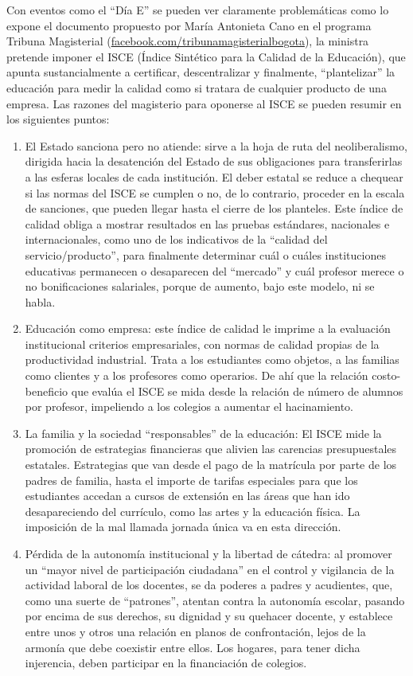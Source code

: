 \documentclass[10pt,twoside]{article}
\begin{document}
Con eventos como el “Día E” se pueden ver claramente problemáticas como lo expone el documento propuesto por María Antonieta Cano en el programa Tribuna Magisterial (\url{facebook.com/tribunamagisterialbogota}), la ministra pretende imponer el ISCE (Índice Sintético para la Calidad de la Educación), que apunta sustancialmente a certificar, descentralizar y finalmente, “plantelizar” la educación para medir la calidad como si tratara de cualquier producto de una empresa. Las razones del magisterio para oponerse al ISCE se pueden resumir en los siguientes puntos:
\begin{enumerate}
\item El Estado sanciona pero no atiende: sirve a la hoja de ruta del neoliberalismo, dirigida hacia la desatención del Estado de sus obligaciones para transferirlas a las esferas locales de cada institución. El deber estatal se reduce a chequear si las normas del ISCE se cumplen o no, de lo contrario, proceder en la escala de sanciones, que pueden llegar hasta el cierre de los planteles. Este índice de calidad obliga a mostrar resultados en las pruebas estándares, nacionales e internacionales, como uno de los indicativos de la “calidad del servicio/producto”, para finalmente determinar cuál o cuáles instituciones educativas permanecen o desaparecen del “mercado” y cuál profesor merece o no bonificaciones salariales, porque de aumento, bajo este modelo, ni se habla.
\item Educación como empresa: este índice de calidad le imprime a la evaluación institucional criterios empresariales, con normas de calidad propias de la productividad industrial. Trata a los estudiantes como objetos, a las familias como clientes y a los profesores como operarios. De ahí que la relación costo-beneficio que evalúa el ISCE se mida desde la relación de número de alumnos por profesor, impeliendo a los colegios a aumentar el hacinamiento.
\item La familia y la sociedad “responsables” de la educación: El ISCE mide la promoción de estrategias financieras que alivien las carencias presupuestales estatales. Estrategias que van desde el pago de la matrícula por parte de los padres de familia, hasta el importe de tarifas especiales para que los estudiantes accedan a cursos de extensión en las áreas que han ido desapareciendo del currículo, como las artes y la educación física. La imposición de la mal llamada jornada única va en esta dirección.
\item Pérdida de la autonomía institucional y la libertad de cátedra: al promover un “mayor nivel de participación ciudadana” en el control y vigilancia de la actividad laboral de los docentes, se da poderes a padres y acudientes, que, como una suerte de “patrones”, atentan contra la autonomía escolar, pasando por encima de sus derechos, su dignidad y su quehacer docente, y establece entre unos y otros una relación en planos de confrontación, lejos de la armonía que debe coexistir entre ellos. Los hogares, para tener dicha injerencia, deben participar en la financiación de colegios.

\end{enumerate}
\end{document}
